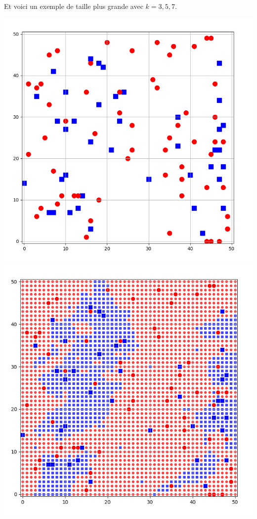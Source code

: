 \documentclass[10pt,class=report,crop=false]{standalone}
\begin{document}
\begin{activite}
\begin{enumerate}
\begin{enumerate}
Et voici un exemple de taille plus grande avec $k=3,5,7$.
\begin{center}
	\includegraphics[scale=\myscale,scale=0.133]{ecran-voisins-9a}
	\includegraphics[scale=\myscale,scale=0.137]{ecran-voisins-9b}

\end{center}
\end{enumerate}
\end{enumerate}
\end{activite}
\end{document}
